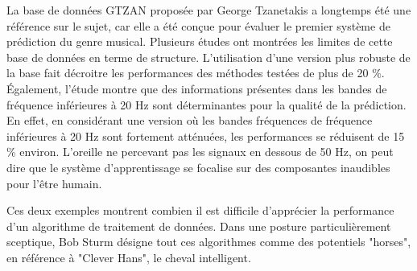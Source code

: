   La base de données GTZAN proposée par George Tzanetakis a longtemps été une référence sur le sujet, car elle a été conçue pour évaluer le premier système de prédiction du genre musical\cite{tzanetakis2002musical}. Plusieurs études ont montrées les limites de cette base de données en terme de structure. L'utilisation d'une version plus robuste de la base fait décroitre les performances des méthodes testées de plus de 20 \%. \'Egalement, l'étude montre que des informations présentes dans les bandes de fréquence inférieures à 20 Hz sont déterminantes pour la qualité de la prédiction. En effet, en considérant une version où les bandes fréquences de fréquence inférieures à 20 Hz sont fortement atténuées, les performances se réduisent de 15 \% environ. L'oreille ne percevant pas les signaux en dessous de 50 Hz, on peut dire que le système d'apprentissage se focalise sur des composantes inaudibles pour l'être humain.

  Ces deux exemples montrent combien il est difficile d'apprécier la performance d'un algorithme de traitement de données. Dans une posture particulièrement sceptique, Bob Sturm désigne tout ces algorithmes comme des potentiels "horses", en référence à "Clever Hans", le cheval intelligent.

